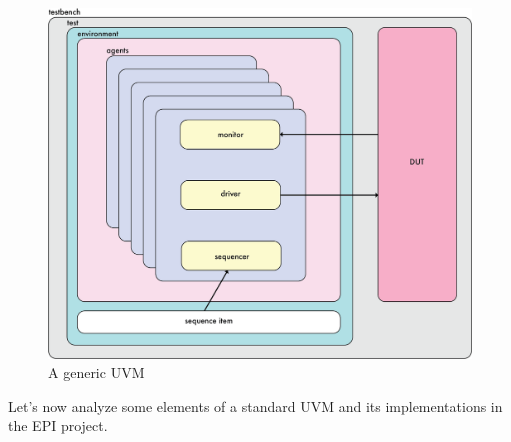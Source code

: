 \begin{figure}[H]
    \centering
    \includegraphics[scale = 0.4]{Chapter_1/img/general-uvm.png}
    \caption{A generic UVM}
    \label{gen-uvm}
\end{figure}

Let's now analyze some elements of a standard UVM and its implementations in the EPI project.

